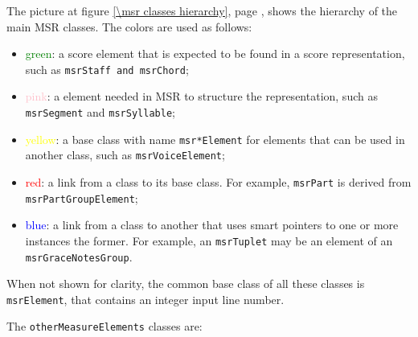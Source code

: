 The picture at figure \ref {\msr classes hierarchy}, page \pageref {\msr classes hierarchy}, shows the hierarchy of the main MSR classes. The  colors are used as follows:
\begin{itemize}

\item  \textcolor{green}{green}: a score element that is expected to be found in a score representation, such as {\tt msrStaff and {\tt msrChord}};

\item  \textcolor{pink}{pink}: a element needed in MSR to structure the representation, such as {\tt msrSegment} and {\tt msrSyllable};

\item  \textcolor{yellow}{yellow}: a base class with name {\tt msr*Element} for elements that can be used in another class, such as {\tt msrVoiceElement};

\item  \textcolor{red}{red}: a link from a class to its base class. For example, {\tt msrPart} is derived from {\tt msrPartGroupElement};

\item  \textcolor{blue}{blue}: a link from a class to another that uses smart pointers to one or more instances the former. For example, an {\tt msrTuplet} may be an element of an {\tt msrGraceNotesGroup}.
\end{itemize}

When not shown for clarity, the common base class of all these classes is {\tt msrElement}, that contains an integer input line number.

The {\tt otherMeasureElements} classes are: 


